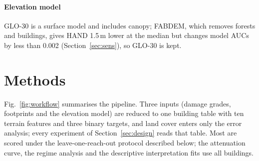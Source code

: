 \documentclass[journal,a4paper]{IEEEtran}
\begin{document}
\paragraph{Elevation model} GLO-30 is a surface model and includes canopy; FABDEM, which removes forests and buildings, gives HAND 1.5\,m lower at the median but changes model AUCs by less than 0.002 (Section~\ref{sec:sens}), so GLO-30 is kept.

\section{Methods}\label{sec:methods}
Fig.~\ref{fig:workflow} summarises the pipeline. Three inputs (damage grades, footprints and the elevation model) are reduced to one building table with ten terrain features and three binary targets, and land cover enters only the error analysis; every experiment of Section~\ref{sec:design} reads that table. Most are scored under the leave-one-reach-out protocol described below; the attenuation curve, the regime analysis and the descriptive interpretation fits use all buildings.
\end{document}
